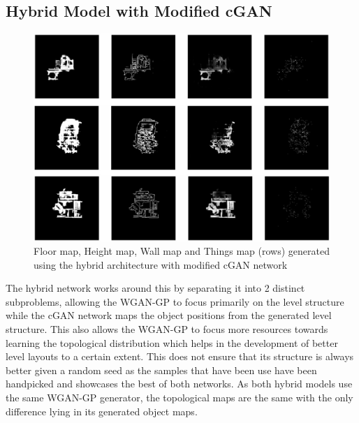 \documentclass{Configuration_Files/PoliMi3i_thesis}
\begin{document}
\subsection{Hybrid Model with Modified cGAN}
\begin{figure}[H]
    \centering
    \includegraphics[width=1\textwidth]{mod_cgan_sample.jpg}
    \caption[Samples generated using the modified cGAN network]{Floor map, Height map, Wall map and Things map (rows) generated 
using the hybrid architecture with modified cGAN network}
    \label{fig:modcgansample}
\end{figure}
The hybrid network works around this by separating it into 2 distinct subproblems, 
allowing the WGAN-GP to focus primarily on the level structure while the cGAN
network maps the object positions from the generated level structure. This also 
allows the WGAN-GP to focus more resources towards learning the topological 
distribution which helps in the development of better level layouts to a certain 
extent. This does not ensure that its structure is always better given a random seed as 
the samples that have been use have been handpicked and showcases the best of 
both networks. As both hybrid models use the same WGAN-GP generator, the 
topological maps are the same with the only difference lying in its generated object 
maps.
\end{document}
